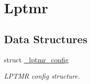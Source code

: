 \hypertarget{group__lptmr}{}\section{Lptmr}
\label{group__lptmr}
\subsection*{Data Structures}
\begin{DoxyCompactItemize}
\item 
struct \mbox{\hyperlink{struct__lptmr__config}{\+\_\+lptmr\+\_\+config}}
\begin{DoxyCompactList}\small\item\em L\+P\+T\+MR config structure. \end{DoxyCompactList}\end{DoxyCompactItemize}
